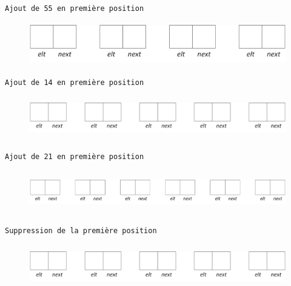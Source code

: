 \documentclass[11pt,a4paper]{article}
\begin{document}
\begin{center}


\texttt{Ajout de 55 en première position}

\begin{figure}[ht!]
\centering
\centerline{  %
\includegraphics[height=1.85cm]{img/Liste_p_vide_4.png}
}
\end{figure}


\texttt{Ajout de 14 en première position}

\begin{figure}[ht!]
\centering
\centerline{  %
\includegraphics[height=1.85cm]{img/Liste_p_vide_5.png}
}
\end{figure}


\texttt{Ajout de 21 en première position}

\begin{figure}[ht!]
\centering
\centerline{  %
\includegraphics[height=1.85cm]{img/Liste_p_vide_6.png}
}
\end{figure}


\texttt{Suppression de la première position}

\begin{figure}[ht!]
\centering
\centerline{  %
\includegraphics[height=1.85cm]{img/Liste_p_vide_5.png}
}
\end{figure}



\end{center}
\end{document}
